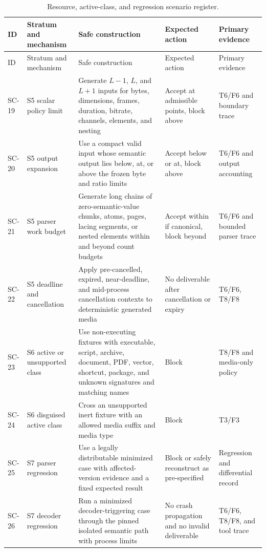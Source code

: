 \begingroup
\scriptsize
\setlength{\tabcolsep}{2.5pt}
\begin{longtable}{L{0.08\textwidth}L{0.16\textwidth}L{0.34\textwidth}L{0.11\textwidth}L{0.13\textwidth}}
\caption{Resource, active-class, and regression scenario register.}
\label{tab:scenario-resource}\\
\toprule
ID & Stratum and mechanism & Safe construction & Expected action & Primary evidence \\
\midrule
\endfirsthead
\toprule
ID & Stratum and mechanism & Safe construction & Expected action & Primary evidence \\
\midrule
\endhead
SC-19 & S5 scalar policy limit & Generate $L-1$, $L$, and $L+1$ inputs for bytes, dimensions, frames, duration, bitrate, channels, elements, and nesting & Accept at admissible points, block above & T6/F6 and boundary trace \\
SC-20 & S5 output expansion & Use a compact valid input whose semantic output lies below, at, or above the frozen byte and ratio limits & Accept below or at, block above & T6/F6 and output accounting \\
SC-21 & S5 parser work budget & Generate long chains of zero-semantic-value chunks, atoms, pages, lacing segments, or nested elements within and beyond count budgets & Accept within if canonical, block beyond & T6/F6 and bounded parser trace \\
SC-22 & S5 deadline and cancellation & Apply pre-cancelled, expired, near-deadline, and mid-process cancellation contexts to deterministic generated media & No deliverable after cancellation or expiry & T6/F6, T8/F8 \\
SC-23 & S6 active or unsupported class & Use non-executing fixtures with executable, script, archive, document, PDF, vector, shortcut, package, and unknown signatures and matching names & Block & T8/F8 and media-only policy \\
SC-24 & S6 disguised active class & Cross an unsupported inert fixture with an allowed media suffix and media type & Block & T3/F3 \\
SC-25 & S7 parser regression & Use a legally distributable minimized case with affected-version evidence and a fixed expected result & Block or safely reconstruct as pre-specified & Regression and differential record \\
SC-26 & S7 decoder regression & Run a minimized decoder-triggering case through the pinned isolated semantic path with process limits & No crash propagation and no invalid deliverable & T6/F6, T8/F8, and tool trace \\
\bottomrule
\end{longtable}
\endgroup


